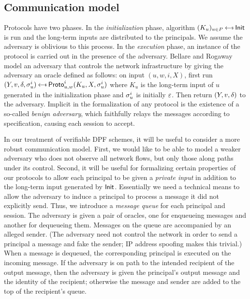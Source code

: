 \subsection{Communication model}\label{sec-com}
Protocols have two phases. In the \emph{initialization} phase, algorithm
$(K_u)_{u\in P} \getsr \init$ is run and the long-term inputs are
distributed to the principals. We assume the adversary is oblivious to this
process.
%
In the \emph{execution} phase, an instance of the protocol is carried out in the
presence of the adversary.
%
Bellare and Rogaway \cite{protos} model an adversary that controls
the network infrastructure by giving the adversary an oracle defined as follows:
%
on input $(u, w, i, X)$, first run $(Y, v, \verdict, \st_{u}^i) \getsr
\proto_{u,w}^i(K_u, X, \st_{u}^i)$ where $K_u$ is the long-term input of $u$
generated in the initialization phase and $\sigma_{u}^i$ is initially
$\varepsilon$. Then return $(Y, v, \delta)$ to the adversary.
%
Implicit in the formalization of any protocol is the existence of a so-called
\emph{benign adversary}, which faithfully relays the messages according to
specification, causing each session to accept.

In our treatment of verifiable DPF schemes, it will be useful to consider a more
robust communication model.  First, we would like to be able to model a weaker
adversary who does not observe all network flows, but only those along paths
under its control. Second, it will be useful for formalizing certain properties
of our protocols to allow each principal to be given a \emph{private input} in
addition to the long-term input generated by $\mathsf{Init}$.
%
Essentially we need a technical means to allow the adversary to induce a
principal to process a message it did not explicitly send. Thus, we introduce a
\emph{message queue} for each principal and session.
%
The adversary is given a pair of oracles, one for enqueueing messages and
another for dequeueing them. Messages on the queue are accompanied by an alleged
sender. (The adversary need not control the network in order to send a
principal a message and fake the sender; IP address spoofing makes this
trivial.) When a message is dequeued, the corresponding principal is executed on
the incoming message. If the adversary is on path to the intended recipient of
the output message, then the adversary is given the principal's output message
and the identity of the recipient; otherwise the message and sender are added to
the top of the recipient's queue.

